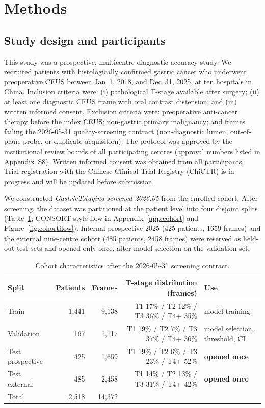 \documentclass[11pt,a4paper]{article}
\begin{document}
\section{Methods}

\subsection{Study design and participants}

This study was a prospective, multicentre diagnostic accuracy study. We recruited patients with histologically confirmed gastric cancer who underwent preoperative CEUS between Jan~1, 2018, and Dec~31, 2025, at ten hospitals in China. Inclusion criteria were: (i) pathological T-stage available after surgery; (ii) at least one diagnostic CEUS frame with oral contrast distension; and (iii) written informed consent. Exclusion criteria were: preoperative anti-cancer therapy before the index CEUS; non-gastric primary malignancy; and frames failing the 2026-05-31 quality-screening contract (non-diagnostic lumen, out-of-plane probe, or duplicate acquisition). The protocol was approved by the institutional review boards of all participating centres (approval numbers listed in Appendix~S8). Written informed consent was obtained from all participants. Trial registration with the Chinese Clinical Trial Registry (ChiCTR) is in progress and will be updated before submission.

We constructed \textit{GastricTstaging-screened-2026.05} from the enrolled cohort. After screening, the dataset was partitioned at the patient level into four disjoint splits (Table~\ref{tab:cohort}; CONSORT-style flow in Appendix~\ref{app:cohort} and Figure~\ref{fig:cohortflow}). Internal prospective 2025 (425 patients, 1659 frames) and the external nine-centre cohort (485 patients, 2458 frames) were reserved as held-out test sets and opened only once, after model selection on the validation set.

\begin{table}[t]
\caption{Cohort characteristics after the 2026-05-31 screening contract.}
\label{tab:cohort}
\centering
\begin{tabular}{lrrrl}
\toprule
\textbf{Split} & \textbf{Patients} & \textbf{Frames} & \textbf{T-stage distribution (frames)} & \textbf{Use} \\
\midrule
Train            & 1{,}441 & 9{,}138  & T1 17\% / T2 12\% / T3 36\% / T4+ 35\% & model training \\
Validation       & 167     & 1{,}117  & T1 19\% / T2 7\% / T3 37\% / T4+ 36\% & model selection, threshold, CI \\
Test prospective & 425     & 1{,}659  & T1 19\% / T2 6\% / T3 23\% / T4+ 52\% & \textbf{opened once} \\
Test external    & 485     & 2{,}458  & T1 14\% / T2 13\% / T3 31\% / T4+ 42\% & \textbf{opened once} \\
\midrule
Total            & 2{,}518 & 14{,}372 & & \\
\bottomrule
\end{tabular}
\end{table}
\end{document}
